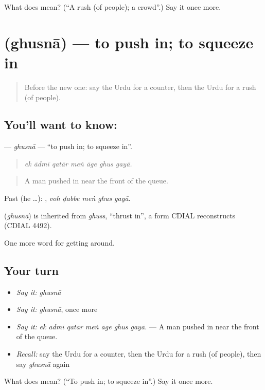 \begin{tcolorbox}[breakable,colback=teal!4,colframe=teal!35!black,title={Before you move on}]
What does  mean? (\textquotedblleft{}A rush (of people); a crowd\textquotedblright{}.) Say it once more.
\end{tcolorbox}
\section[\texorpdfstring{\ur{گھسنا} (ghusnā)}{گھسنا (ghusnā)}]{ (ghusnā) — to push in; to squeeze in}

\label{lesson:UR-C391-ghusna}



\begin{quote}
Before the new one: say the Urdu for a counter, then the Urdu for a rush (of people).
\end{quote}

\subsection*{You'll want to know: }
\textbf{} — \emph{ghusnā} — \textquotedblleft{}to push in; to squeeze in\textquotedblright{}.

\begin{quote}
      
\end{quote}

\begin{quote}
\emph{ek ādmī qatār meṅ āge ghus gayā.}
\end{quote}

\begin{quote}
A man pushed in near the front of the queue.
\end{quote}

Past (he …):     , \emph{voh ḍabbe meṅ ghus gayā}.

\begin{cousinweb}
\textbf{} (\emph{ghusnā}) is inherited from \emph{ghuss}, \textquotedblleft{}thrust in\textquotedblright{}, a form CDIAL reconstructs (CDIAL 4492).
\end{cousinweb}

\begin{grammarlens}[title={What you've built}]
One more word for getting around.
\end{grammarlens}

\subsection*{Your turn}
\begin{itemize}
\raggedright
  \item \emph{Say it:} \emph{ghusnā}
  \item \emph{Say it:} \emph{ghusnā}, once more
  \item \emph{Say it:} \emph{ek ādmī qatār meṅ āge ghus gayā.} — A man pushed in near the front of the queue.
  \item \emph{Recall:} say the Urdu for a counter, then the Urdu for a rush (of people), then say \emph{ghusnā} again
\end{itemize}

\begin{tcolorbox}[breakable,colback=teal!4,colframe=teal!35!black,title={Before you move on}]
What does  mean? (\textquotedblleft{}To push in; to squeeze in\textquotedblright{}.) Say it once more.
\end{tcolorbox}
